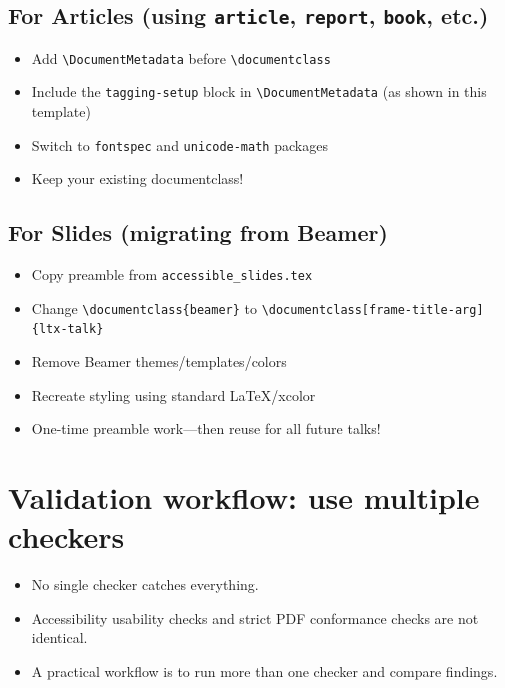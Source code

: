 \documentclass{article}
\newcommand\RedText[1]{\textcolor{AccessibleRed}{#1}}
\newcommand\GreenText[1]{\textcolor{AccessibleGreen}{#1}}
\begin{document}
\subsection{For Articles (using \texttt{article}, \texttt{report}, \texttt{book}, etc.)}

\begin{itemize}
\item Add \texttt{\textbackslash DocumentMetadata} before \texttt{\textbackslash documentclass}
\item Include the \texttt{tagging-setup} block in \texttt{\textbackslash DocumentMetadata} (as shown in this template)
\item Switch to \texttt{fontspec} and \texttt{unicode-math} packages
\item \GreenText{Keep your existing documentclass!}
\end{itemize}

\subsection{For Slides (migrating from Beamer)}

\begin{itemize}
\item Copy preamble from \texttt{accessible\_slides.tex}
\item Change \texttt{\textbackslash documentclass\{beamer\}} to \texttt{\textbackslash documentclass[frame-title-arg]\{ltx-talk\}}
\item \RedText{Remove Beamer themes/templates/colors}
\item \GreenText{Recreate styling} using standard LaTeX/xcolor
\item \GreenText{One-time preamble work}---then reuse for all future talks!
\end{itemize}

\section{Validation workflow: use multiple checkers}

\begin{itemize}
\item No single checker catches everything.
\item Accessibility usability checks and strict PDF conformance checks are not identical.
\item A practical workflow is to run more than one checker and compare findings.
\end{itemize}
\end{document}
